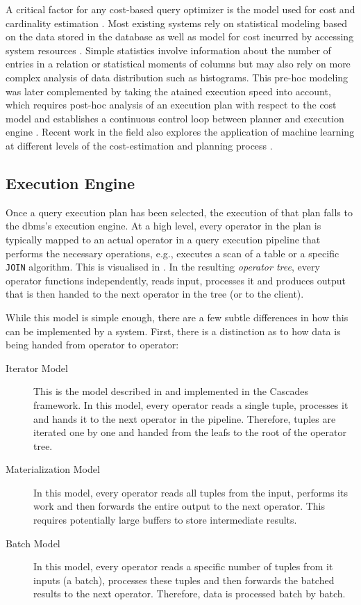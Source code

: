A critical factor for any cost-based query optimizer is the model used for cost and cardinality estimation \cite{Jarke:1984Query,Yin:2015Robust}. Most existing systems rely on statistical modeling based on the data stored in the database \cite{Getoor:2001Selectivity,Ioannidis:2003History} as well as model for cost incurred by accessing system resources \cite{Manegold:2002Generic}. Simple statistics involve information about the number of entries in a relation or statistical moments of columns but may also rely on more complex analysis of data distribution such as histograms. This pre-hoc modeling was later complemented by taking the atained execution speed into account, which requires post-hoc analysis of an execution plan with respect to the cost model and establishes a continuous control loop between planner and execution engine \cite{Mackert:1986R}. Recent work in the field also explores the application of machine learning at different levels of the cost-estimation and planning process \cite{Wu:2013Predicting,Vu:2019Deep,Abadi:2020Seattle}.

\subsection{Execution Engine}

Once a query execution plan has been selected, the execution of that plan falls to the \acrshort{dbms}'s execution engine. At a high level, every operator in the plan is typically mapped to an actual operator in a query execution pipeline that performs the necessary operations, e.g., executes a scan of a table or a specific \texttt{JOIN} algorithm. This is visualised in . In the resulting \emph{operator tree}, every operator functions independently, reads input, processes it and produces output that is then handed to the next operator in the tree (or to the client).

While this model is simple enough, there are a few subtle differences in how this can be implemented by a system. First, there is a distinction as to how data is being handed from operator to operator:

\begin{description}
    \item[Iterator Model] This is the model described in \cite{Graefe:1993Volcano,Graefe:1993Query} and implemented in the Cascades \cite{Graefe:1995Cascades} framework. In this model, every operator reads a single tuple, processes it and hands it to the next operator in the pipeline. Therefore, tuples are iterated one by one and handed from the leafs to the root of the operator tree.
    \item[Materialization Model] In this model, every operator reads all tuples from the input, performs its work and then forwards the entire output to the next operator. This requires potentially large buffers to store intermediate results.
    \item[Batch Model] In this model, every operator reads a specific number of tuples from it inputs (a batch), processes these tuples and then forwards the batched results to the next operator. Therefore, data is processed batch by batch.
\end{description}

